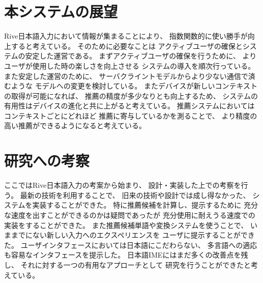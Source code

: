 \section{本システムの展望}
Rive日本語入力において情報が集まることにより、
指数関数的に使い勝手が向上すると考えている。
そのために必要なことは
アクティブユーザの確保とシステムの安定した運営である。
まずアクティブユーザの確保を行うために、
よりユーザが使用した時の楽しさを向上させる
システムの導入を順次行っている。
また安定した運営のために、
サーバクライントモデルからより少ない通信で済むような
モデルへの変更を検討している。
またデバイスが新しいコンテキストの取得が可能になれば、
推薦の精度が多少なりとも向上するため、
システムの有用性はデバイスの進化と共に上がると考えている。
推薦システムにおいてはコンテキストごとにどれほど
推薦に寄与しているかを測ることで、
より精度の高い推薦ができるようになると考えている。

\section{研究への考察}
ここではRive日本語入力の考案から始まり、
設計・実装した上での考察を行う。
最新の技術を利用することで、
旧来の技術や設計では成し得なかった、
システムを実装することができた。
特に推薦候補を計算し、提示するために
充分な速度を出すことができるのかは疑問であったが
充分使用に耐えうる速度での実装をすることができた。
また推薦候補単語や変換システムを使うことで、
いままでにない新しい入力へのエクスペリエンスを
ユーザに提示することができた。
ユーザインタフェースにおいては日本語にこだわらない、
多言語への適応も容易なインタフェースを提示した。
日本語IMEにはまだ多くの改善点を残し、
それに対する一つの有用なアプローチとして
研究を行うことができたと考えている。

